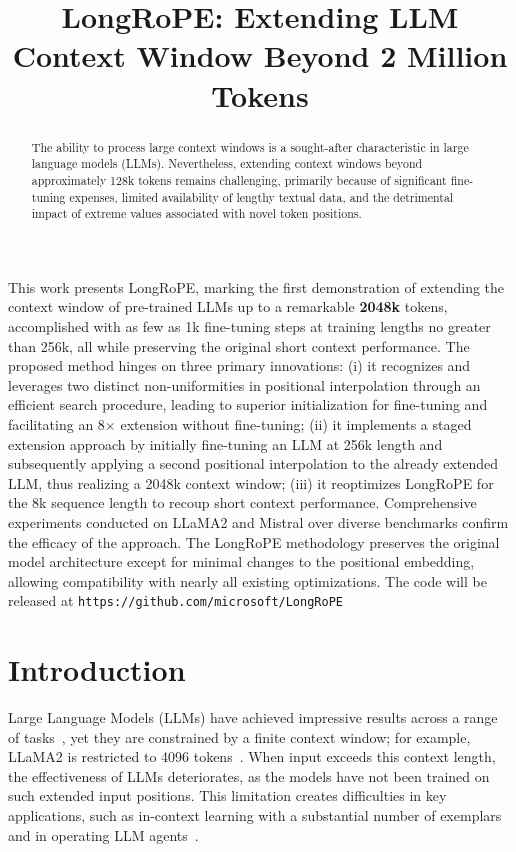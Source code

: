 \title{LongRoPE: Extending LLM Context Window Beyond 2 Million Tokens}

\begin{abstract}
The ability to process large context windows is a sought-after characteristic in large language models (LLMs). Nevertheless, extending context windows beyond approximately 128k tokens remains challenging, primarily because of significant fine-tuning expenses, limited availability of lengthy textual data, and the detrimental impact of extreme values associated with novel token positions.
\end{abstract}

This work presents LongRoPE, marking the first demonstration of extending the context window of pre-trained LLMs up to a remarkable \textbf{2048k} tokens, accomplished with as few as 1k fine-tuning steps at training lengths no greater than 256k, all while preserving the original short context performance. The proposed method hinges on three primary innovations: (i) it recognizes and leverages two distinct non-uniformities in positional interpolation through an efficient search procedure, leading to superior initialization for fine-tuning and facilitating an 8$\times$ extension without fine-tuning; (ii) it implements a staged extension approach by initially fine-tuning an LLM at 256k length and subsequently applying a second positional interpolation to the already extended LLM, thus realizing a 2048k context window; (iii) it reoptimizes LongRoPE for the 8k sequence length to recoup short context performance. Comprehensive experiments conducted on LLaMA2 and Mistral over diverse benchmarks confirm the efficacy of the approach. The LongRoPE methodology preserves the original model architecture except for minimal changes to the positional embedding, allowing compatibility with nearly all existing optimizations. The code will be released at \texttt{https://github.com/microsoft/LongRoPE}

\section{Introduction}

Large Language Models (LLMs) have achieved impressive results across a range of tasks~\cite{gpt4,llama2}, yet they are constrained by a finite context window; for example, LLaMA2 is restricted to 4096 tokens~\cite{llama2}. When input exceeds this context length, the effectiveness of LLMs deteriorates, as the models have not been trained on such extended input positions. This limitation creates difficulties in key applications, such as in-context learning with a substantial number of exemplars~\cite{Huang2023FewerIM} and in operating LLM agents~\cite{park2023generative,madaan2023selfrefine}.

